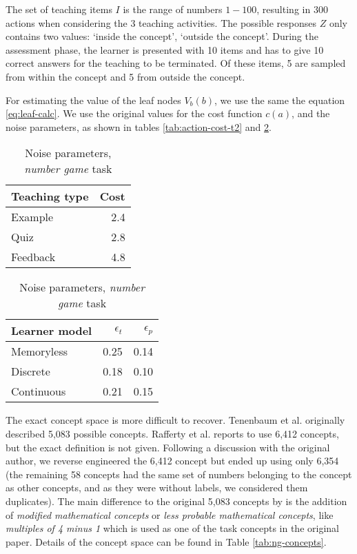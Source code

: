 The set of teaching items $I$ is the range of numbers $1-100$, resulting in $300$ actions when considering the $3$ teaching activities.
The possible responses $Z$ only contains two values: `inside the concept', `outside the concept'.
During the assessment phase, the learner is presented with 10 items and has to give 10 correct answers for the teaching to be terminated. Of these items, 5 are sampled from within the concept and 5 from outside the concept.

For estimating the value of the leaf nodes $V_b(b)$, we use the same the equation \ref{eq:leaf-calc}.
We use the original values for the cost function $c(a)$, and the noise parameters, as shown in tables \ref{tab:action-cost-t2} and \ref{tab:noise-t2}.


\begin{table}
\small
\parbox{.49\linewidth}{
    \centering
    \begin{tabular}{l|r}
        \hline
        \textbf{Teaching type} & \textbf{Cost} \\
        \hline
        Example & 2.4 \\
        Quiz    & 2.8 \\
        Feedback & 4.8 \\
        \hline
    \end{tabular}
    \caption{Action costs, \textit{number game} task}
    \label{tab:action-cost-t2}
}
\hfill
\parbox{.49\linewidth}{
    \centering
    \begin{tabular}{l|rr}
        \hline
        \textbf{Learner model} & $\epsilon_t$ & $\epsilon_p$ \\
        \hline
        Memoryless  & 0.25 & 0.14 \\
        Discrete    & 0.18 & 0.10 \\
        Continuous  & 0.21 & 0.15 \\
        \hline
    \end{tabular}
    \caption{Noise parameters, \textit{number game} task}
    \label{tab:noise-t2}
}
\end{table}

The exact concept space is more difficult to recover. Tenenbaum et al. \cite{tenenbaum2000rules} originally described 5,083 possible concepts. Rafferty et al. reports to use 6,412 concepts, but the exact definition is not given. 
Following a discussion with the original author, we reverse engineered the 6,412 concept but ended up using only 6,354 (the remaining 58 concepts had the same set of numbers belonging to the concept as other concepts, and as they were without labels, we considered them duplicates).
The main difference to the original 5,083 concepts by \cite{tenenbaum2000rules} is the addition of \textit{modified mathematical concepts} or \textit{less probable mathematical concepts}, like \textit{multiples of 4 minus 1} which is used as one of the task concepts in the original paper.
Details of the concept space can be found in Table \ref{tab:ng-concepts}.


